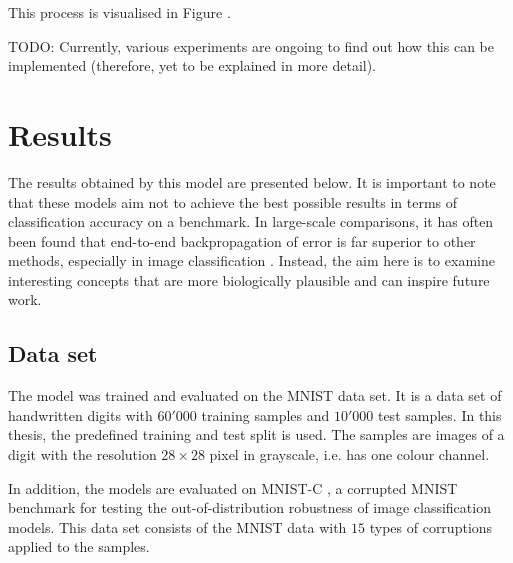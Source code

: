 This process is visualised in Figure . 


TODO: Currently, various experiments are ongoing to find out how this can be implemented (therefore, yet to be explained in more detail).




\section{Results}
The results obtained by this model are presented below. It is important to note that these models aim not to achieve the best possible results in terms of classification accuracy on a benchmark. In large-scale comparisons, it has often been found that end-to-end backpropagation of error is far superior to other methods, especially in image classification . Instead, the aim here is to examine interesting concepts that are more biologically plausible and can inspire future work.

\subsection{Data set}
The model was trained and evaluated on the MNIST \cite{Lecun_Bottou_Bengio_Haffner_1998} data set. It is a data set of handwritten digits with $60'000$ training samples and $10'000$ test samples.
In this thesis, the predefined training and test split is used.
The samples are images of a digit with the resolution $28 \times 28$ pixel in grayscale, i.e. has one colour channel.

In addition, the models are evaluated on MNIST-C , a corrupted MNIST benchmark for testing the out-of-distribution robustness of image classification models. This data set consists of the MNIST data with $15$ types of corruptions applied to the samples.

